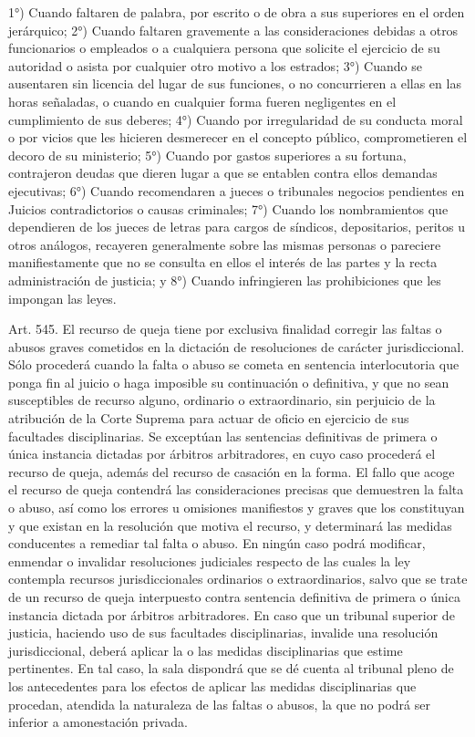     1°) Cuando faltaren de palabra, por escrito o de obra a sus superiores en el orden jerárquico;
    2°) Cuando faltaren gravemente a las consideraciones debidas a otros funcionarios o empleados o a cualquiera persona que solicite el ejercicio de su autoridad o asista por cualquier otro motivo a los estrados;
    3°) Cuando se ausentaren sin licencia del lugar de sus funciones, o no concurrieren a ellas en las horas señaladas, o cuando en cualquier forma fueren negligentes en el cumplimiento de sus deberes;
    4°) Cuando por irregularidad de su conducta moral o por vicios que les hicieren desmerecer en el concepto público, comprometieren el decoro de su ministerio;
    5°) Cuando por gastos superiores a su fortuna, contrajeron deudas que dieren lugar a que se entablen contra ellos demandas ejecutivas;
    6°) Cuando recomendaren a jueces o tribunales negocios pendientes en Juicios contradictorios o causas criminales;
    7°) Cuando los nombramientos que dependieren de los jueces de letras para cargos de síndicos, depositarios, peritos u otros análogos, recayeren generalmente sobre las mismas personas o pareciere manifiestamente que no se consulta en ellos el interés de las partes y la recta administración de justicia; y
    8°) Cuando infringieren las prohibiciones que les impongan las leyes.

    Art. 545. El recurso de queja tiene por exclusiva finalidad corregir las faltas o abusos graves cometidos en la dictación de resoluciones de carácter jurisdiccional. Sólo procederá cuando la falta o abuso se cometa en sentencia interlocutoria que ponga fin al juicio o haga imposible su continuación o definitiva, y que no sean susceptibles de recurso alguno, ordinario o extraordinario, sin perjuicio de la atribución de la Corte Suprema para actuar de oficio en ejercicio de sus facultades disciplinarias. Se exceptúan las sentencias definitivas de primera o única instancia dictadas por árbitros arbitradores, en cuyo caso procederá el recurso de queja, además del recurso de casación en la forma.
    El fallo que acoge el recurso de queja contendrá las consideraciones precisas que demuestren la falta o abuso, así como los errores u omisiones manifiestos y graves que los constituyan y que existan en la resolución que motiva el recurso, y determinará las medidas conducentes a remediar tal falta o abuso. En ningún caso podrá modificar, enmendar o invalidar resoluciones judiciales respecto de las cuales la ley contempla recursos jurisdiccionales ordinarios o extraordinarios, salvo que se trate de un recurso de queja interpuesto contra sentencia definitiva de primera o única instancia dictada por árbitros arbitradores.
    En caso que un tribunal superior de justicia, haciendo uso de sus facultades disciplinarias, invalide una resolución jurisdiccional, deberá aplicar la o las medidas disciplinarias que estime pertinentes. En tal caso, la sala dispondrá que se dé cuenta al tribunal pleno de los antecedentes para los efectos de aplicar las medidas disciplinarias que procedan, atendida la naturaleza de las faltas o abusos, la que no podrá ser inferior a amonestación privada.



